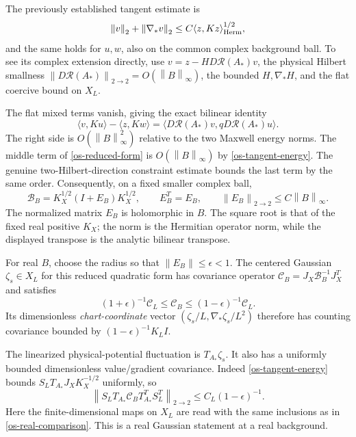 \documentclass[11pt]{article}
\theoremstyle{remark}
\newcommand{\norm}[1]{\left\|#1\right\|}
\begin{document}
The previously established tangent estimate is
\begin{equation}\label{os-tangent-energy}
 \norm v_2+\norm{\nabla_*v}_2
       \le C\langle z,Kz\rangle_{\rm Herm}^{1/2},
\end{equation}
and the same holds for $u,w$, also on the common complex
background ball. To see its complex extension directly, use
$v=z-HD\mathcal R(A_*)v$, the physical Hilbert smallness
$\norm{D\mathcal R(A_*)}_{2\to2}=O(\norm B_\infty)$,
the bounded $H,\nabla_*H$, and the flat coercive bound on $X_L$.

The flat mixed terms vanish, giving the exact bilinear identity
\begin{equation}\label{os-K-difference}
 \langle v,Ku\rangle-\langle z,Kw\rangle
   =\langle D\mathcal R(A_*)v,
                      q D\mathcal R(A_*)u\rangle.
\end{equation}
The right side is $O(\norm B_\infty^2)$ relative to the two
Maxwell energy norms. The middle term of
\eqref{os-reduced-form} is $O(\norm B_\infty)$ by
\eqref{os-tangent-energy}. The genuine two-Hilbert-direction
constraint estimate bounds the last term by the same order.
Consequently, on a fixed smaller complex ball,
\begin{equation}\label{os-relative-bound}
 \mathcal B_B=K_X^{1/2}(I+E_B)K_X^{1/2},\qquad
 E_B^T=E_B,\qquad \norm{E_B}_{2\to2}\le C\norm B_\infty.
\end{equation}
The normalized matrix $E_B$ is holomorphic in $B$. The square
root is that of the fixed real positive $K_X$; the norm is
the Hermitian operator norm, while the displayed transpose
is the analytic bilinear transpose.

For real $B$, choose the radius so that $\norm{E_B}\le\epsilon<1$.
The centered Gaussian $\zeta_s\in X_L$ for this reduced
quadratic form has covariance operator
$\mathcal C_B=J_X\mathcal B_B^{-1}J_X^T$ and satisfies
\begin{equation}\label{os-real-comparison}
 (1+\epsilon)^{-1}\mathcal C_L
     \le\mathcal C_B\le(1-\epsilon)^{-1}\mathcal C_L.
\end{equation}
Its dimensionless \emph{chart-coordinate} vector
$(\zeta_s/L,\nabla_*\zeta_s/L^2)$ therefore has counting
covariance bounded by $(1-\epsilon)^{-1}K_LI$.

The linearized physical-potential fluctuation is
$T_{A_*}\zeta_s$. It also has a uniformly bounded
dimensionless value/gradient covariance. Indeed
\eqref{os-tangent-energy} bounds
$S_LT_{A_*}J_XK_X^{-1/2}$ uniformly, so
\begin{equation}\label{os-tangent-covariance}
 \norm{S_LT_{A_*}\mathcal C_BT_{A_*}^TS_L^T}_{2\to2}
       \le C_L(1-\epsilon)^{-1}.
\end{equation}
Here the finite-dimensional maps on $X_L$ are read with the
same inclusions as in \eqref{os-real-comparison}. This is a
real Gaussian statement at a real background.
\end{document}
